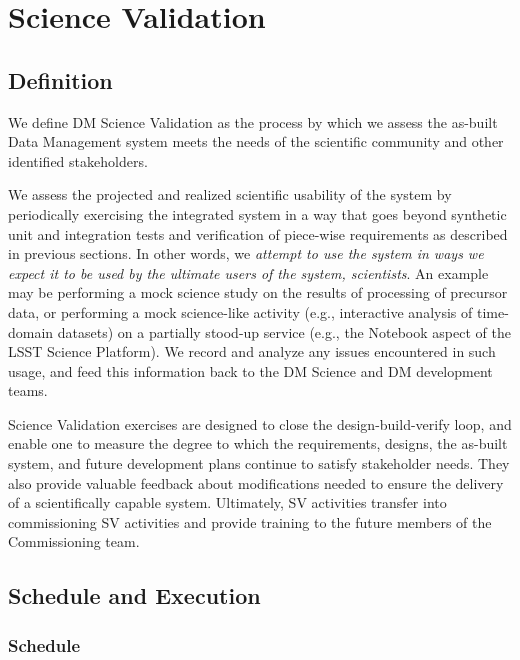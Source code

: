 \section{Science Validation} \label{sect:scival}

\subsection{Definition}

We define DM Science Validation as the process by which we
assess the as-built Data Management system meets the needs of the
scientific community and other identified stakeholders.

We assess the projected and realized scientific usability of the system by
periodically exercising the integrated system in a way that goes beyond
synthetic unit and integration tests and verification of piece-wise
requirements as described in previous sections.  In other words, we \emph{
attempt to use the system in ways we expect it to be used by the ultimate
users of the system, scientists}.  An example may be performing a mock
science study on the results of processing of precursor data, or performing
a mock science-like activity (e.g., interactive analysis of time-domain
datasets) on a partially stood-up service (e.g., the Notebook aspect of the
LSST Science Platform).  We record and analyze any issues encountered in
such usage, and feed this information back to the DM Science and DM
development teams.

Science Validation exercises are designed to close the design-build-verify
loop, and enable one to measure the degree to which the requirements,
designs, the as-built system, and future development plans continue to
satisfy stakeholder needs.  They also provide valuable feedback about
modifications needed to ensure the delivery of a scientifically capable
system.  Ultimately, SV activities transfer into commissioning SV activities
and provide training to the future members of the Commissioning team.


\subsection{Schedule and Execution}

\subsubsection{Schedule}

